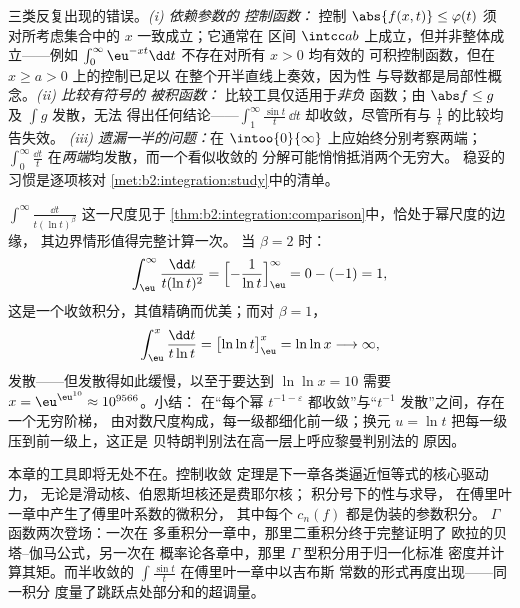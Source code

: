 \begin{remark}[常见陷阱]
三类反复出现的错误。\emph{(i) 依赖参数的
控制函数：} 控制 $\abs{f(x,t)} \leq \varphi(t)$ 须
对所考虑集合中的 $x$ 一致成立；它通常在
区间 $\intcc ab$ 上成立，但并非整体成立——例如
$\int_0^\infty\eu^{-xt}\dd t$ 不存在对所有 $x > 0$ 均有效的
可积控制函数，但在 $x \geq a > 0$ 上的控制已足以
在整个开半直线上奏效，因为性
与导数都是局部性概念。\emph{(ii) 比较有符号的
被积函数：} 比较工具仅适用于\emph{非负}
函数；由 $\abs f \leq g$ 及 $\int g$ 发散，无法
得出任何结论——$\int_1^\infty\frac{\sin t}t\,\dd t$
却收敛，尽管所有与 $\frac1t$ 的比较均告失效。
\emph{(iii) 遗漏一半的问题：}在
$\intoo{0}{\infty}$ 上应始终分别考察两端；
$\int_0^\infty\frac{\dd t}{t}$ 在\emph{两端}均发散，而一个看似收敛的
分解可能悄悄抵消两个无穷大。
稳妥的习惯是逐项核对
\cref{met:b2:integration:study}中的清单。
\end{remark}

\begin{example}\label{ex:b2:integration:bertrandboundary}
$\int^\infty\frac{\dd t}{t(\ln t)^\beta}$ 这一尺度见于
\cref{thm:b2:integration:comparison}中，恰处于幂尺度的边缘，
其边界情形值得完整计算一次。
当 $\beta = 2$ 时：
\[
\int_\eu^{\infty}\frac{\dd t}{t(\ln t)^2}
= \Bigl[-\frac{1}{\ln t}\Bigr]_\eu^{\infty}
= 0 - (-1) = 1 ,
\]
这是一个收敛积分，其值精确而优美；而对
$\beta = 1$，
\[
\int_\eu^{x}\frac{\dd t}{t\ln t}
= \bigl[\ln\ln t\bigr]_\eu^{x} = \ln\ln x
\longrightarrow \infty ,
\]
发散——但发散得如此缓慢，以至于要达到 $\ln\ln x = 10$
需要 $x = \eu^{\eu^{10}} \approx 10^{9566}$。小结：
在“每个幂 $t^{-1-\varepsilon}$
都收敛”与“$t^{-1}$ 发散”之间，存在一个无穷阶梯，
由对数尺度构成，每一级都细化前一级；换元
$u = \ln t$ 把每一级压到前一级上，这正是
贝特朗判别法在高一层上呼应黎曼判别法的
原因。
\end{example}

\begin{remark}[本分册的展望]
本章的工具即将无处不在。控制收敛
定理是下一章各类逼近恒等式的核心驱动力，
无论是滑动核、伯恩斯坦核还是费耶尔核；
积分号下的性与求导，
在傅里叶一章中产生了傅里叶系数的微积分，
其中每个 $c_n(f)$ 都是伪装的参数积分。
$\Gamma$ 函数两次登场：一次在
多重积分一章中，那里二重积分终于完整证明了
欧拉的贝塔–伽马公式，另一次在
概率论各章中，那里 $\Gamma$ 型积分用于归一化标准
密度并计算其矩。而半收敛的
$\int\frac{\sin t}{t}$ 在傅里叶一章中以吉布斯
常数的形式再度出现——同一积分
度量了跳跃点处部分和的超调量。
\end{remark}


